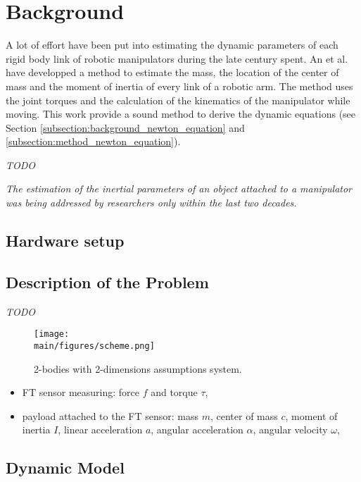 \documentclass[/home/francois/latex/report/main.tex]{subfiles}
\begin{document}
\chapter{Background}
\label{chapter:background}

A lot of effort have been put into estimating the dynamic parameters of each rigid body link of robotic manipulators during the late century spent. An et al. \cite{An1985} have developped a method to estimate the mass, the location of the center of mass and the moment of inertia of every link of a robotic arm. The method uses the joint torques and the calculation of the kinematics of the manipulator while moving. This work provide a sound method to derive the dynamic equations (see Section \ref{subsection:background_newton_equation} and \ref{subsection:method_newton_equation}).

\textit{TODO}

{\it
The estimation of the inertial parameters of an object attached to a manipulator was being addressed by researchers only within the last two decades.
}

\section{Hardware setup}
\label{section:hardware}



\section{Description of the Problem}
\label{section:description}

\textit{TODO}

\begin{figure}[H]
  \centering
  \texttt{[image: \\main/figures/scheme.png]}
  \caption{2-bodies with 2-dimensions assumptions system.}
  \label{fig:background:payload_sensor}
\end{figure}

\begin{itemize}
 \item \ac{FT} sensor measuring: force $f$ and torque $\tau$,
 \item payload attached to the \ac{FT} sensor: mass $m$, center of mass $c$, moment of inertia $I$, linear acceleration $a$, angular acceleration $\alpha$, angular velocity $\omega$,
\end{itemize}

\section{Dynamic Model}
\end{document}

